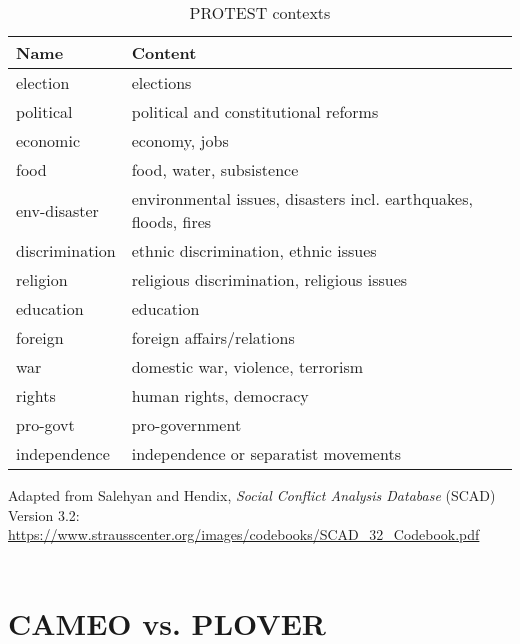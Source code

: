 \documentclass[11pt]{report}
\begin{document}
\begin{table}[htp]
\caption{PROTEST contexts}
\begin{center}
\begin{tabular}{|l|l|}
\hline
Name & Content \\
\hline
election   &   elections\\
political   &   political and constitutional reforms\\
economic &   economy, jobs\\
food           &   food, water, subsistence\\
env-disaster            &   environmental issues, disasters incl. earthquakes, floods, fires\\
discrimination            &   ethnic discrimination, ethnic issues\\
religion           &   religious discrimination, religious issues\\
education            &   education\\
foreign            &   foreign affairs/relations\\
war            &   domestic war, violence, terrorism\\
rights             &   human rights, democracy\\
pro-govt             &   pro-government\\
independence & independence or separatist movements\\
\hline
\end{tabular}
\end{center}
\label{tab:protestcontext}
\raggedright{Adapted from Salehyan and Hendix, \textit{Social Conflict Analysis Database} (SCAD)
Version 3.2: \url{https://www.strausscenter.org/images/codebooks/SCAD\_32\_Codebook.pdf}}\\~
\end{table}



\chapter{CAMEO vs. PLOVER}
\end{document}
